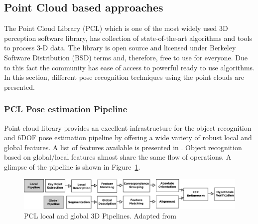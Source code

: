 \subsection{Point Cloud based approaches}
\label{ssec:pcl}
	The Point Cloud Library (PCL)\cite{rusu20113d} which is one of the most widely used 3D perception software library, has collection of state-of-the-art algorithms and tools to process 3-D data. The library is open source and licensed under Berkeley Software Distribution (BSD) terms and, therefore, free to use for everyone. Due to this fact the community has ease of access to powerful ready to use algorithms. In this section, different pose recognition techniques using the point clouds are presented.
\subsubsection{PCL Pose estimation Pipeline}
	Point cloud library provides an excellent infrastructure for the object recognition and 6DOF pose estimation pipeline by offering a wide variety of robust local and global features. A list of features available is presented in \cite{aldoma2012point}. Object recognition based on global/local features almost share the same flow of operations. A glimpse of the pipeline is shown in Figure~\ref{fig:pcl_pipeline}.
\begin{figure}[H]
\centering
\includegraphics[width=1\textwidth]{assets/pcl_pipeline.eps}
\caption[PCL local and global 3D Pipelines]{PCL local and global 3D Pipelines. {Adapted from \cite{aldoma2012point}}}
\label{fig:pcl_pipeline}
\end{figure}
